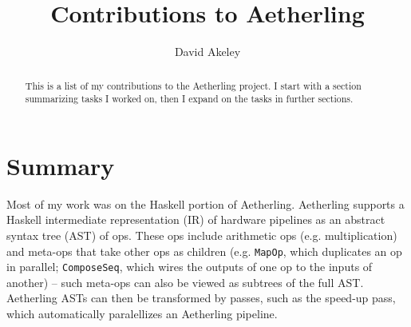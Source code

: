 \documentclass[12pt]{article}
\begin{document}
\sloppy
\title{Contributions to Aetherling}
\author{David Akeley}
\maketitle

\begin{abstract}
This is a list of my contributions to the Aetherling project. I start
with a section summarizing tasks I worked on, then I expand on the
tasks in further sections.
\end{abstract}

\section{Summary}

Most of my work was on the Haskell portion of Aetherling.  Aetherling
supports a Haskell intermediate representation (IR) of hardware
pipelines as an abstract syntax tree (AST) of ops.  These ops include
arithmetic ops (e.g. multiplication) and meta-ops that take other ops
as children (e.g. \texttt{MapOp}, which duplicates an op in parallel;
\texttt{ComposeSeq}, which wires the outputs of one op to the inputs
of another) -- such meta-ops can also be viewed as subtrees of the
full AST. Aetherling ASTs can then be transformed by passes,
such as the speed-up pass, which automatically paralellizes an
Aetherling pipeline.
\end{document}
